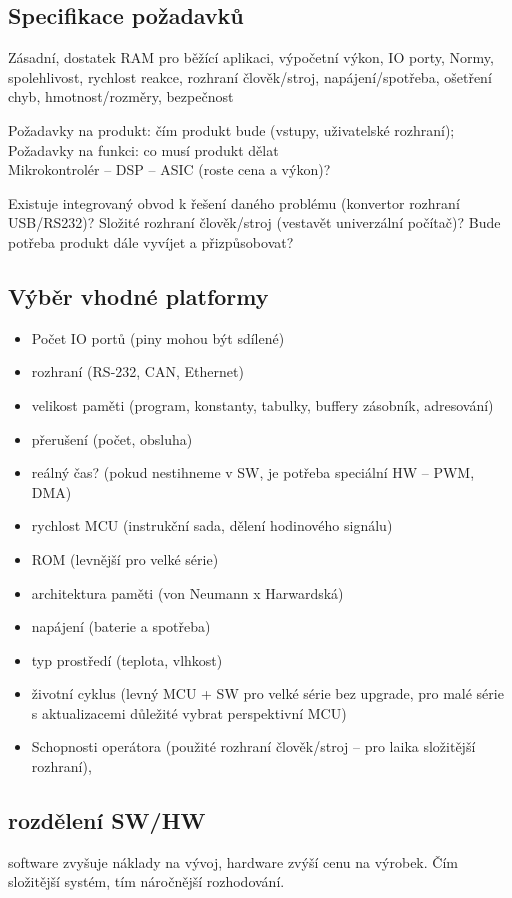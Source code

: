 \documentclass[a4paper, 11pt]{report}
\begin{document}
\subsection{Specifikace požadavků}
Zásadní, dostatek RAM pro běžící aplikaci, výpočetní výkon, IO porty, Normy, spolehlivost, rychlost reakce, rozhraní člověk/stroj, napájení/spotřeba, ošetření chyb, hmotnost/rozměry, bezpečnost

Požadavky na produkt: čím produkt bude (vstupy, uživatelské rozhraní); Požadavky na funkci: co musí produkt dělat\\

Mikrokontrolér -- DSP -- ASIC (roste cena a výkon)?

Existuje integrovaný obvod k řešení daného problému (konvertor rozhraní USB/RS232)? Složité rozhraní člověk/stroj (vestavět univerzální počítač)? Bude potřeba produkt dále vyvíjet a přizpůsobovat?

\subsection{Výběr vhodné platformy}
\begin{itemize}
	\item Počet IO portů (piny mohou být sdílené)
	\item rozhraní (RS-232, CAN, Ethernet)
	\item velikost paměti (program, konstanty, tabulky, buffery zásobník, adresování)
	\item přerušení (počet, obsluha)
	\item reálný čas? (pokud nestihneme v SW, je potřeba speciální HW -- PWM, DMA)
	\item rychlost MCU (instrukční sada, dělení hodinového signálu)
	\item ROM (levnější pro velké série)
	\item architektura paměti (von Neumann x Harwardská)
	\item napájení (baterie a spotřeba)
	\item typ prostředí (teplota, vlhkost)
	\item životní cyklus (levný MCU + SW pro velké série bez upgrade, pro malé série s aktualizacemi důležité vybrat perspektivní MCU)
	\item Schopnosti operátora (použité rozhraní člověk/stroj -- pro laika složitější rozhraní), 
\end{itemize}

\subsection{rozdělení SW/HW}
software zvyšuje náklady na vývoj, hardware zvýší cenu na výrobek. Čím složitější systém, tím náročnější rozhodování.
\end{document}
